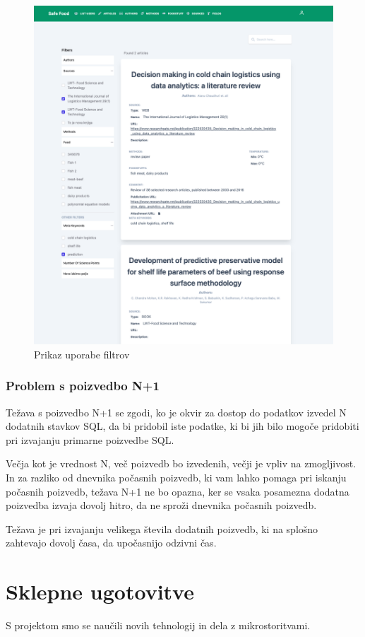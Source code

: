 \documentclass[a4paper, 12pt]{book}
\begin{document}
\begin{figure}[h]
\begin{center}
\includegraphics[width=1\textwidth]{slike/search.png}
\end{center}
\caption{ Prikaz uporabe filtrov }
\label{type-checkbox}
\end{figure}



\subsection{Problem s poizvedbo N+1}
Težava s poizvedbo N+1 se zgodi, ko je okvir za dostop do podatkov izvedel N dodatnih stavkov SQL, da bi pridobil iste podatke, ki bi jih bilo mogoče pridobiti pri izvajanju primarne poizvedbe SQL.

Večja kot je vrednost N, več poizvedb bo izvedenih, večji je vpliv na zmogljivost. In za razliko od dnevnika počasnih poizvedb, ki vam lahko pomaga pri iskanju počasnih poizvedb, težava N+1 ne bo opazna, ker se vsaka posamezna dodatna poizvedba izvaja dovolj hitro, da ne sproži dnevnika počasnih poizvedb.

Težava je pri izvajanju velikega števila dodatnih poizvedb, ki na splošno zahtevajo dovolj časa, da upočasnijo odzivni čas.


\chapter{Sklepne ugotovitve}
S projektom smo se naučili novih tehnologij in dela z mikrostoritvami. 

\clearpage
{}


\end{document}
